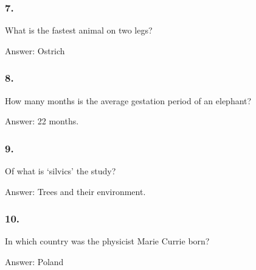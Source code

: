 \documentclass{beamer}
\begin{document}
    \begin{frame}
        \frametitle{7.}
        What is the fastest animal on two legs?\\

        \begin{center}
            Answer: Ostrich
        \end{center}
    \end{frame}

    \begin{frame}
        \frametitle{8.}
        How many months is the average gestation period of an elephant?\\

        \begin{center}
            Answer: 22 months.
        \end{center}
    \end{frame}

    \begin{frame}
        \frametitle{9.}
        Of what is `silvics' the study?\\

        \begin{center}
            Answer: Trees and their environment.
        \end{center}
    \end{frame}

    \begin{frame}
        \frametitle{10.}
        In which country was the physicist Marie Currie born?\\

        \begin{center}
            Answer: Poland
        \end{center}
    \end{frame}
\end{document}
